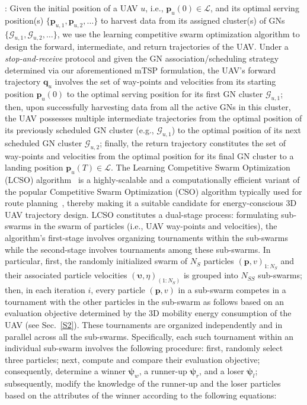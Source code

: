 \documentclass[10pt, twocolumn]{IEEEtran}
\begin{document}
: Given the initial position of a UAV $u$, i.e., $\mathbf{p}_{u}(0){\in}\mathcal{L}$, and its optimal serving position(s) $\{\mathbf{p}_{u,1},\mathbf{p}_{u,2},{\dots}\}$ to harvest data from its assigned cluster(s) of GNs $\{\mathcal{G}_{u,1},\mathcal{G}_{u,2},{\dots}\}$, we use the learning competitive swarm optimization algorithm to design the forward, intermediate, and return trajectories of the UAV. Under a \emph{stop-and-receive} protocol and given the GN association/scheduling strategy determined via our aforementioned mTSP formulation, the UAV's forward trajectory $\mathbf{q}_{u}$ involves the set of way-points and velocities from its starting position $\mathbf{p}_{u}(0)$ to the optimal serving position for its first GN cluster $\mathcal{G}_{u,1}$; then, upon successfully harvesting data from all the active GNs in this cluster, the UAV possesses multiple intermediate trajectories from the optimal position of its previously scheduled GN cluster (e.g., $\mathcal{G}_{u,1}$) to the optimal position of its next scheduled GN cluster $\mathcal{G}_{u,2}$; finally, the return trajectory constitutes the set of way-points and velocities from the optimal position for its final GN cluster to a landing position $\mathbf{p}_{u}(T){\in}\mathcal{L}$. The Learning Competitive Swarm Optimization (LCSO) algorithm~\cite{LCSO} is a highly-scalable and a computationally efficient variant of the popular Competitive Swarm Optimization (CSO) algorithm typically used for route planning~\cite{MAESTRO_TCCN}, thereby making it a suitable candidate for energy-conscious $3$D UAV trajectory design. LCSO constitutes a dual-stage process: formulating sub-swarms in the swarm of particles (i.e., UAV way-points and velocities), the algorithm's first-stage involves organizing tournaments within the sub-swarms while the second-stage involves tournaments among these sub-swarms. In particular, first, the randomly initialized swarm of $N_{S}$ particles $(\mathbf{p}, v)_{1:N_{S}}$ and their associated particle velocities $(\boldsymbol{\upsilon}, \eta)_{(1:N_{S})}$ is grouped into $N_{SS}$ sub-swarms; then, in each iteration $i$, every particle $(\mathbf{p}, v)$ in a sub-swarm competes in a tournament with the other particles in the sub-swarm as follows based on an evaluation objective determined by the $3$D mobility energy consumption of the UAV (see Sec.~\ref{S2}). These tournaments are organized independently and in parallel across all the sub-swarms. Specifically, each such tournament within an individual sub-swarm involves the following procedure: first, randomly select three particles; next, compute and compare their evaluation objective; consequently, determine a winner $\boldsymbol{\psi}_{w}$, a runner-up $\boldsymbol{\psi}_{r}$, and a loser $\boldsymbol{\psi}_{l}$; subsequently, modify the knowledge of the runner-up and the loser particles based on the attributes of the winner according to the following equations:
\end{document}
